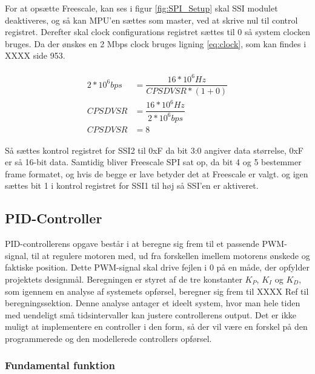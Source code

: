 For at opsætte Freescale, kan ses i figur \ref{fig:SPI_Setup} skal SSI modulet deaktiveres, og så kan MPU'en sættes som master, ved at skrive nul til control registret.
Derefter skal clock configurations registret sættes til 0 så system clocken bruges.
Da der ønskes en 2 Mbps clock bruges ligning \eqref{eq:clock}, som kan findes i \cite{TM4C123GH6PMDatasheet}XXXX side 953.

\begin{align}
\begin{split}
2*10^6 bps &= \dfrac{16*10^6 Hz}{CPSDVSR * (1 + 0)}\\
CPSDVSR &= \dfrac{16*10^6 Hz}{2*10^6 bps}\\
CPSDVSR &= 8
\end{split}
\label{eq:clock}
\end{align}

Så sættes kontrol registret for SSI2 til 0xF da bit 3:0 angiver data størrelse, 0xF er så 16-bit data. Samtidig bliver Freescale SPI sat op, da bit 4 og 5 bestemmer frame formatet, og hvis de begge er lave betyder det at Freescale er valgt. 
og igen sættes bit 1 i kontrol registret for SSI1 til høj så SSI'en er aktiveret.

\subsection{PID-Controller}

PID-controllerens opgave består i at beregne sig frem til et passende PWM-signal, til at regulere motoren med, ud fra forskellen imellem motorens ønskede og faktiske position. Dette PWM-signal skal drive fejlen i 0 på en måde, der opfylder projektets designmål. Beregningen er styret af de tre konstanter $K_{P}$, $K_{I}$ og $K_{D}$, som igennem en analyse af systemets opførsel, beregner sig frem til XXXX Ref til beregningssektion. Denne analyse antager et ideelt system, hvor man hele tiden med uendeligt små tidsintervaller kan justere controllerens output. Det er ikke muligt at implementere en controller i den form, så der vil være en forskel på den programmerede og den modellerede controllers opførsel.


\subsubsection{Fundamental funktion}

